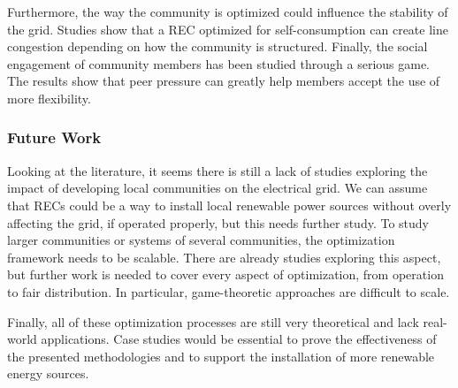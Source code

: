 \documentclass[12pt,a4paper]{article}
\begin{document}
Furthermore, the way the community is optimized could influence the stability of the grid. Studies show that a REC optimized for self-consumption can create line congestion depending on how the community is structured.
Finally, the social engagement of community members has been studied through a serious game. The results show that peer pressure can greatly help members accept the use of more flexibility.

\subsubsection*{Future Work}

Looking at the literature, it seems there is still a lack of studies exploring the impact of developing local communities on the electrical grid. We can assume that RECs could be a way to install local renewable power sources without overly affecting the grid, if operated properly, but this needs further study.
To study larger communities or systems of several communities, the optimization framework needs to be scalable. There are already studies exploring this aspect, but further work is needed to cover every aspect of optimization, from operation to fair distribution. In particular, game-theoretic approaches are difficult to scale.

Finally, all of these optimization processes are still very theoretical and lack real-world applications. Case studies would be essential to prove the effectiveness of the presented methodologies and to support the installation of more renewable energy sources.


% 



\end{document}
